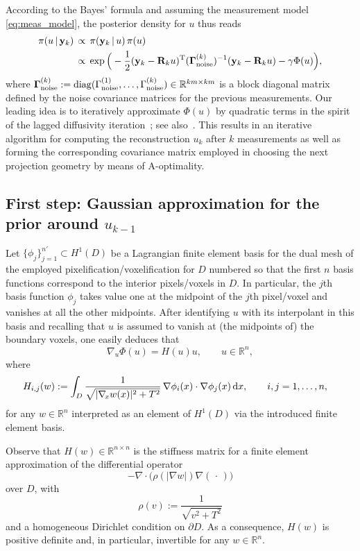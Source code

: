 \documentclass[final]{siamltex}
\newcommand{\R}{\mathbb{R}}
\begin{document}
According to the Bayes' formula and assuming the measurement model \eqref{eq:meas_model}, the posterior density for $u$ thus reads
\begin{align}
  \label{eq:post_u}
\pi(u \, | \, \mathbf{y}_k) \, &\propto \, \pi( \mathbf{y}_k \, | \, u) \, \pi(u)  \nonumber \\
&\propto \, \exp \Big(-\frac{1}{2}  (\mathbf{y}_k - \mathbf{R}_k u )^{\rm T} (\bm{\Gamma}_{\rm noise}^{(k)})^{-1}(\mathbf{y}_k - \mathbf{R}_k u ) - \gamma \Phi(u) \Big),
\end{align}
where $\bm{\Gamma}_{\rm noise}^{(k)} := {\rm diag}(\Gamma_{\rm noise}^{(1)}, \dots, \Gamma_{\rm noise}^{(k)})\in \R^{km \times km}$ is a block diagonal matrix defined by the noise covariance matrices for the previous measurements.
Our leading idea is to iteratively approximate $\Phi(u)$ by quadratic terms in the spirit of the lagged diffusivity iteration~\cite{Vogel96}; see also~\cite{Arridge13,Harhanen15}. This results in an iterative algorithm for computing the reconstruction $u_k$ after $k$ measurements as well as forming the corresponding covariance matrix employed in choosing the next projection geometry by means of A-optimality.

\subsection{First step: Gaussian approximation for the prior around $u_{k-1}$}
Let $\{ \phi_j\}_{j=1}^{n'} \subset H^1(D)$ be a Lagrangian finite element basis for the dual mesh of the employed pixelification/voxelification for $D$ numbered so that the first $n$ basis functions correspond to the interior pixels/voxels in $D$. In particular, the $j$th basis function $\phi_j$ takes value one at the midpoint of the $j$th pixel/voxel and vanishes at all the other midpoints. After identifying $u$ with its interpolant in this basis and recalling that $u$ is assumed to vanish at (the midpoints of) the boundary voxels, one easily deduces that
$$
\nabla_{\!u} \Phi(u) = H(u)u, \qquad u \in \R^n,
$$
where
\begin{align}
\label{eq:H}
H_{i,j}(w)
&:= \int_{D} \frac{1}{\sqrt{|\nabla_{\!x} w(x)|^2 + T^2}} \, \nabla \phi_i(x) \cdot \nabla \phi_j(x) \, {\rm d} x,
\qquad i,j=1,\dots, n,
\end{align}
for any $w \in \R^n$ interpreted as an element of $H^1(D)$ via the introduced finite element basis.

Observe that $H(w) \in \R^{n \times n}$ is the stiffness matrix for a finite element approximation of the differential operator
\begin{equation}
\label{eq:diffop}
- \nabla \cdot \big( \rho (|\nabla w|)  \nabla (\, \cdot \,) \big)
\end{equation}
over $D$, with
$$
\rho(v) := \frac{1}{\sqrt{v^2 + T^2}}
$$
and a homogeneous Dirichlet condition on $\partial D$. As a consequence, $H(w)$ is positive definite and, in particular, invertible for any $w \in \R^n$.
\end{document}
